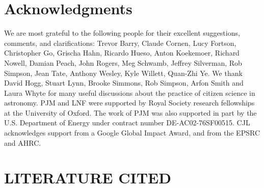 \documentclass{ar2e}
\begin{document}

\section*{Acknowledgments}

We are most grateful to the following people for their excellent suggestions,
comments, and clarifications: 
Trevor Barry, 
Claude Cornen, 
Lucy Fortson, 
Christopher Go, 
Grischa Hahn, 
Ricardo Hueso, 
Anton Koekemoer,
Richard Nowell, 
Damian Peach,  
John Rogers,
Meg Schwamb,
Jeffrey Silverman, 
Rob Simpson, 
Jean Tate, 
Anthony Wesley, 
Kyle Willett, 
Quan-Zhi Ye.
%
We thank David Hogg, Stuart Lynn, Brooke Simmons, Rob Simpson, Arfon Smith and 
Laura Whyte for many useful discussions about the practice of citizen science 
in astronomy.
%
PJM and LNF were supported by Royal Society research fellowships at the
University of Oxford. The work of PJM was also supported in part  by the U.S.
Department of Energy under contract number DE-AC02-76SF00515. CJL acknowledges
support from a Google Global Impact Award, and from the EPSRC and AHRC. 
%



\section{LITERATURE CITED}




\end{document}
